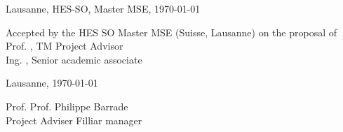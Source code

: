 \vfill

\begin{otherlanguage}{english}
\begin{flushright}
	Lausanne, HES-SO, Master MSE, \today
\end{flushright}
\end{otherlanguage}

	\thispagestyle{empty}


	\afterpage{\null\newpage}


\newpage

\begin{flushleft}
	Accepted by the HES SO Master MSE (Suisse, Lausanne) on the proposal of \\[12pt]
	Prof. \professeur, TM Project Advisor\\
	Ing. \assistant, Senior academic associate\\[48pt]
\end{flushleft}

\begin{otherlanguage}{english}
\begin{flushleft}
	Lausanne, \today \\[48pt]
\end{flushleft}
\end{otherlanguage}

\begin{flushleft}
	Prof. \professeur \hfill Prof. Philippe Barrade \\
	Project Adviser  \hfill Filliar manager \\
\end{flushleft}


	
	
